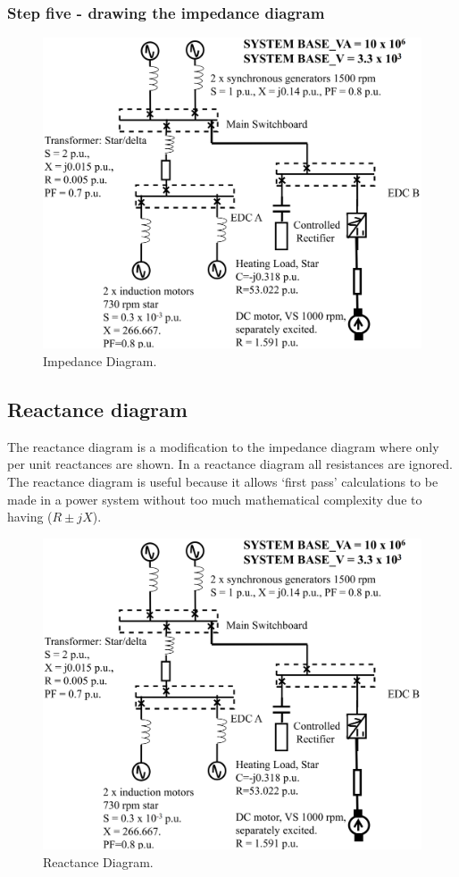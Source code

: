 \subsubsection{Step five - drawing the impedance diagram}
\begin{figure}[H]
	\centering
	\includegraphics[width = \textwidth]{./img/figure13.png}
	\caption{Impedance Diagram.}
\end{figure}
\subsection{Reactance diagram}
The reactance diagram is a modification to the impedance diagram where only per unit reactances are shown. In a reactance diagram all resistances are ignored. The reactance diagram is useful because it allows `first pass' calculations to be made in a power system without too much mathematical complexity due to having ($R \pm jX$).
\begin{figure}[H]
	\centering
	\includegraphics[width = \textwidth]{./img/figure13.png}
	\caption{Reactance Diagram.}
\end{figure}
